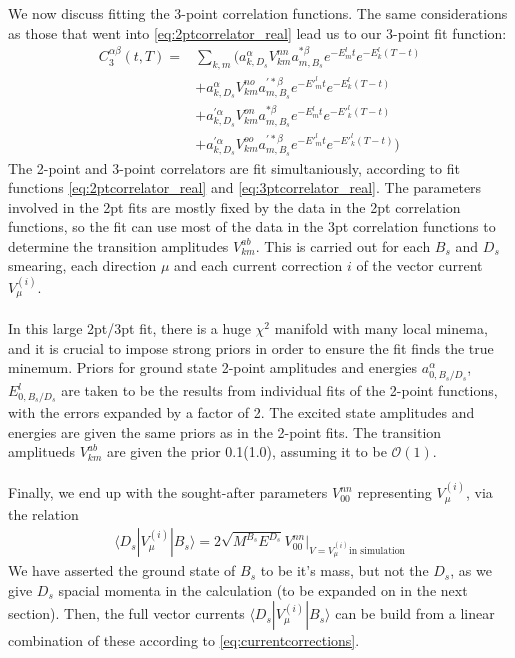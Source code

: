 \\ \\
We now discuss fitting the 3-point correlation functions. The same considerations as those that went into \eqref{eq:2ptcorrelator_real} lead us to our 3-point fit function:
\begin{align}
	\nonumber
	C^{\alpha\beta}_3(t,T) =& \sum_{k,m} \big( a_{k,D_s}^{\alpha} V^{nn}_{km} a_{m,B_s}^{*\beta} e^{-E^l_m t} e^{-E^l_k (T-t)} \\
	\nonumber
	& + a_{k,D_s}^{\alpha} V^{no}_{km} a_{m,B_s}^{'*\beta} e^{-E'^l_m t} e^{-E^l_k (T-t)} \\
	\nonumber
	& + a_{k,D_s}^{'\alpha} V^{on}_{km} a_{m,B_s}^{*\beta} e^{-E^l_m t} e^{-E'^l_k (T-t)} \\
	& + a_{k,D_s}^{'\alpha} V^{oo}_{km} a_{m,B_s}^{'*\beta} e^{-E'^l_m t} e^{-E'^l_k (T-t)} \big)
	\label{eq:3ptcorrelator_real}
\end{align}
The 2-point and 3-point correlators are fit simultaniously, according to fit functions \eqref{eq:2ptcorrelator_real} and \eqref{eq:3ptcorrelator_real}. The parameters involved in the 2pt fits are mostly fixed by the data in the 2pt correlation functions, so the fit can use most of the data in the 3pt correlation functions to determine the transition amplitudes $V^{ab}_{km}$. This is carried out for each $B_s$ and $D_s$ smearing, each direction $\mu$ and each current correction $i$ of the vector current $V^{(i)}_{\mu}$.
\\ \\
In this large 2pt/3pt fit, there is a huge $\chi^2$ manifold with many local minema, and it is crucial to impose strong priors in order to ensure the fit finds the true minemum. Priors for ground state 2-point amplitudes and energies $a_{0,B_s/D_s}^{\alpha}$,$E^l_{0,B_s/D_s}$ are taken to be the results from individual fits of the 2-point functions, with the errors expanded by a factor of 2. The excited state amplitudes and energies are given the same priors as in the 2-point fits. The transition amplitueds $V^{ab}_{km}$ are given the prior 0.1(1.0), assuming it to be $\mathcal{O}(1)$.
\\ \\
Finally, we end up with the sought-after parameters $V_{00}^{nn}$ representing $V_{\mu}^{(i)}$, via the relation
\begin{align}
	\langle D_s | V^{(i)}_{\mu} | B_s \rangle =  2\sqrt{M^{B_s} E^{D_s}} V_{00}^{nn} |_{V=V_{\mu}^{(i)}\text{in simulation}}
\end{align}
We have asserted the ground state of $B_s$ to be it's mass, but not the $D_s$, as we give $D_s$ spacial momenta in the calculation (to be expanded on in the next section). Then, the full vector currents $\langle D_s | V^{(i)}_{\mu} | B_s \rangle$ can be build from a linear combination of these according to \ref{eq:currentcorrections}.

